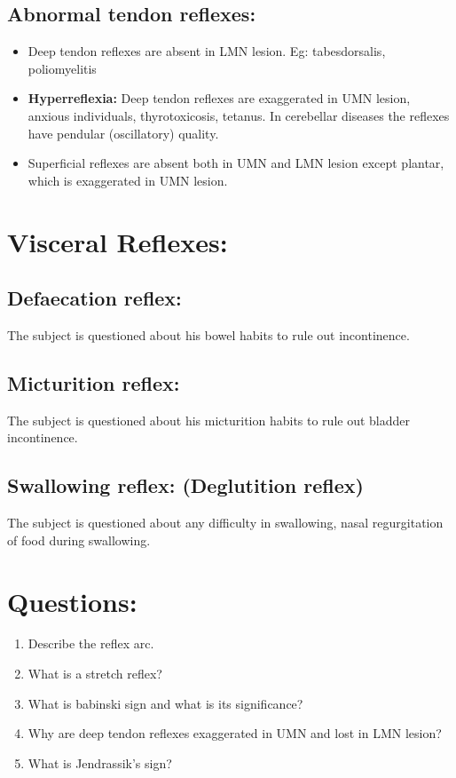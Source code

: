 \documentclass[a4paper,12pt,openany,oneside]{book}
\begin{document}
\subsection*{Abnormal tendon reflexes:}
\begin{itemize}
		\itemsep0em
\item{Deep tendon reflexes are absent in LMN lesion. Eg: tabesdorsalis, poliomyelitis}
\item{\textbf{Hyperreflexia:} Deep tendon reflexes are exaggerated in UMN lesion, anxious individuals, thyrotoxicosis, tetanus. In cerebellar diseases the reflexes have pendular (oscillatory) quality.}
\item{Superficial reflexes are absent both in UMN and LMN lesion except plantar, which is exaggerated in UMN lesion.}
\end{itemize}
\section*{Visceral Reflexes:}
\subsection*{Defaecation reflex:}
The subject is questioned about his bowel habits to rule out incontinence.
\subsection*{Micturition reflex:}
The subject is questioned about his micturition habits to rule out bladder incontinence.
\subsection*{Swallowing reflex: (Deglutition reflex)}
The subject is questioned about any difficulty in swallowing, nasal regurgitation of food during swallowing.
\section*{Questions:}
\begin{enumerate}
		\itemsep0em
\item{Describe the reflex arc.}
\item{What is a stretch reflex?}
\item{What is babinski sign and what is its significance?}
\item{Why are deep tendon reflexes exaggerated in UMN and lost in LMN lesion?}
\item{What is Jendrassik's sign?}
\end{enumerate}
\end{document}
